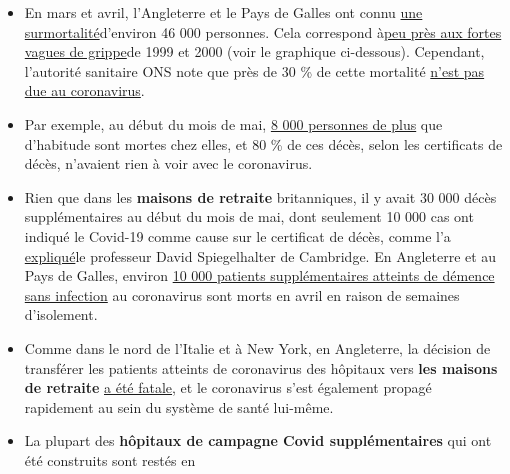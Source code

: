 \begin{itemize}
\tightlist
\item
  En mars et avril, l'Angleterre et le Pays de Galles ont connu
  \href{https://www.ons.gov.uk/peoplepopulationandcommunity/birthsdeathsandmarriages/deaths/articles/analysisofdeathregistrationsnotinvolvingcoronaviruscovid19englandandwales28december2019to1may2020/technicalannex}{une
  surmortalité}d'environ 46 000 personnes. Cela correspond
  à\href{https://off-guardian.org/2020/05/25/were-all-in-the-big-numbers-now/}{peu
  près aux fortes vagues de grippe}de 1999 et 2000 (voir le graphique
  ci-dessous). Cependant, l'autorité sanitaire ONS note que près de 30
  \% de cette mortalité
  \href{https://www.ons.gov.uk/peoplepopulationandcommunity/birthsdeathsandmarriages/deaths/articles/analysisofdeathregistrationsnotinvolvingcoronaviruscovid19englandandwales28december2019to1may2020/technicalannex}{n'est
  pas due au coronavirus}.
\item
  Par exemple, au début du mois de mai,
  \href{https://www.theguardian.com/society/2020/may/08/more-people-dying-at-home-during-covid-19-pandemic-uk-analysis}{8
  000 personnes de plus} que d'habitude sont mortes chez elles, et 80 \%
  de ces décès, selon les certificats de décès, n'avaient rien à voir
  avec le coronavirus.
\item
  Rien que dans les \textbf{maisons de retraite} britanniques, il y
  avait 30 000 décès supplémentaires au début du mois de mai, dont
  seulement 10 000 cas ont indiqué le Covid-19 comme cause sur le
  certificat de décès, comme l'a
  \href{https://www.bmj.com/content/369/bmj.m1931}{expliqué}le
  professeur David Spiegelhalter de Cambridge. En Angleterre et au Pays
  de Galles, environ
  \href{https://www.theguardian.com/world/2020/jun/05/covid-19-causing-10000-dementia-deaths-beyond-infections-research-says}{10
  000 patients supplémentaires atteints de démence sans infection} au
  coronavirus sont morts en avril en raison de semaines d'isolement.
\item
  Comme dans le nord de l'Italie et à New York, en Angleterre, la
  décision de transférer les patients atteints de coronavirus des
  hôpitaux vers \textbf{les maisons de retraite}
  \href{https://drmalcolmkendrick.org/2020/05/11/how-to-make-a-crisis-far-far-worse/}{a
  été fatale}, et le coronavirus s'est également propagé rapidement au
  sein du système de santé lui-même.
\item
  La plupart des \textbf{hôpitaux de campagne Covid supplémentaires} qui
  ont été construits sont restés en

\end{itemize}
